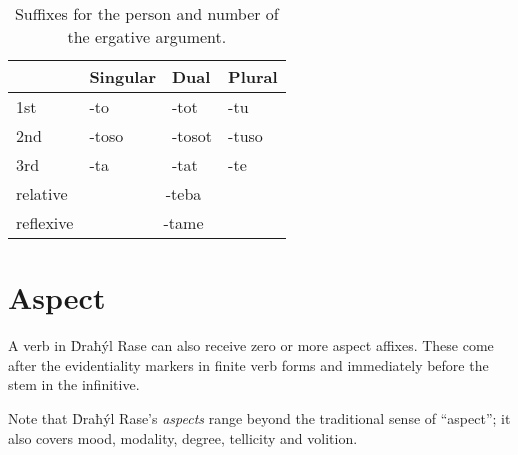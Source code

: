\documentclass{book}
\begin{document}
\begin{table}[ht]
    \caption{Suffixes for the person and number of the ergative argument.}
    \centering
    \begin{tabular}{|l|l|l|l|}
        \hline
        & Singular & Dual & Plural \\
        \hline
        1st & -to & -tot & -tu \\
        2nd & -toso & -tosot & -tuso \\
        3rd & -ta & -tat & -te \\
        \hline
        relative & \multicolumn{3}{c|}{-teba} \\
        reflexive & \multicolumn{3}{c|}{-tame} \\
        \hline
    \end{tabular}
\end{table}

\section{Aspect}

A verb in Ḋraħýl Rase can also receive zero or more aspect affixes. These come after the evidentiality markers in finite verb forms and immediately before the stem in the infinitive.

Note that Ḋraħýl Rase's \emph{aspects} range beyond the traditional sense of ``aspect''; it also covers mood, modality, degree, tellicity and volition.
\end{document}
